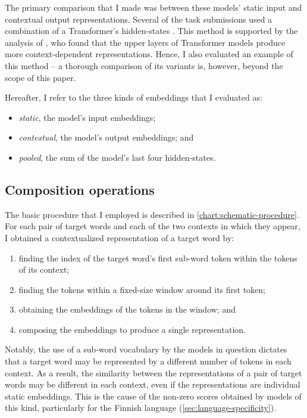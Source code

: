 The primary comparison that I made was between these models' static input and
contextual output representations.
Several of the task submissions used a combination of a Transformer's hidden-states
\parencites[e.g.][276]{Gamallo2020}[61]{CostellaPessutto2020}[145]{Hettiarachchi2020}.
This method is supported by the analysis of \textcite{Ethayarajh2019}, who found that
the upper layers of Transformer models produce more context-dependent representations.
Hence, I also evaluated an example of this method -- a thorough comparison of its
variants is, however, beyond the scope of this paper.
\begin{samepage}
  Hereafter, I refer to the three kinds of embeddings that I evaluated as:
  \begin{itemize}
    \item \emph{static}, the model's input embeddings;
    \item \emph{contextual}, the model's output embeddings; and
    \item \emph{pooled}, the sum of the model's last four hidden-states.
  \end{itemize}
\end{samepage}

\subsection{Composition operations}

The basic procedure that I employed is described in \cref{chart:schematic-procedure}.
For each pair of target words and each of the two contexts in which they appear, I
obtained a contextualized representation of a target word by:
\begin{enumerate}
  \item finding the index of the target word's first sub-word token within the tokens of its context;
  \item finding the tokens within a fixed-size window around its first token;
  \item obtaining the embeddings of the tokens in the window; and
  \item composing the embeddings to produce a single representation.
\end{enumerate}
Notably, the use of a sub-word vocabulary by the models in question
\parencite[e.g.,][4174]{Devlin2019} dictates that a target word may be represented by a
different number of tokens in each context.
As a result, the similarity between the representations of a pair of target words may
be different in each context, even if the representations are individual static
embeddings.
This is the cause of the non-zero scores obtained by models of this kind, particularly
for the Finnish language (\cref{sec:language-specificity}).

